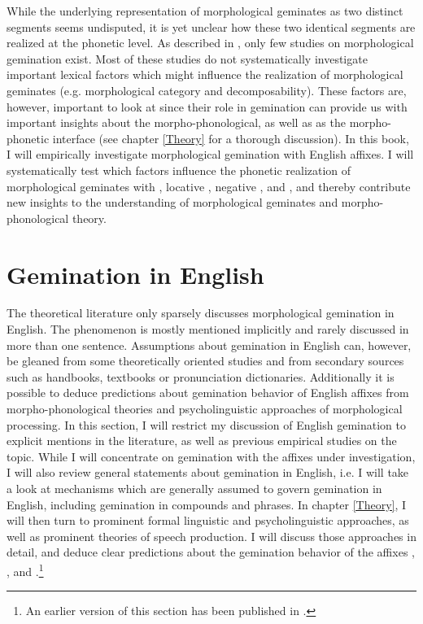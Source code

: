 While the underlying representation of morphological geminates as two distinct segments seems undisputed, it is yet unclear how these two identical segments are realized at the phonetic level. As described in , only few studies on morphological gemination exist. Most of these studies do not systematically investigate important lexical factors which might influence the realization of morphological geminates (e.g. morphological category and decomposability). These factors are, however, important to look at since their role in gemination can provide us with important insights about the morpho-phonological, as well as as the morpho-phonetic interface (see chapter \ref{Theory} for a thorough discussion). 
In this book, I will empirically investigate morphological gemination with English affixes. I will systematically test which factors influence the phonetic realization of morphological geminates with , locative , negative ,  and , and thereby contribute new insights to the understanding of morphological geminates and morpho-phonological theory.


\section{Gemination in English} \label{Gemination in English}

The theoretical literature only sparsely discusses morphological gemination in English. The phenomenon is mostly mentioned implicitly and rarely discussed in more than one sentence.  Assumptions about gemination in English can, however, be gleaned from some  theoretically oriented studies and from secondary sources such as handbooks, textbooks or pronunciation dictionaries. Additionally it is possible to deduce predictions about gemination behavior of English affixes from morpho-phonological theories and psycholinguistic approaches of morphological processing. In this section, I will restrict my discussion of English gemination to explicit mentions in the literature, as well as previous empirical studies on the topic. While I will concentrate on gemination with the affixes under investigation, I will also review general statements about gemination in English, i.e. I will take a look at mechanisms which are generally assumed to govern gemination in English, including gemination in compounds and phrases.
In chapter \ref{Theory}, I will then turn to prominent formal linguistic and psycholinguistic approaches, as well as prominent theories of speech production. I will discuss those approaches in detail, and deduce clear predictions about the gemination behavior of the affixes , ,  and .\footnote{An earlier version of this section has been published in \cite{BenHedia.2017}.}
\label{assumptions}
 

